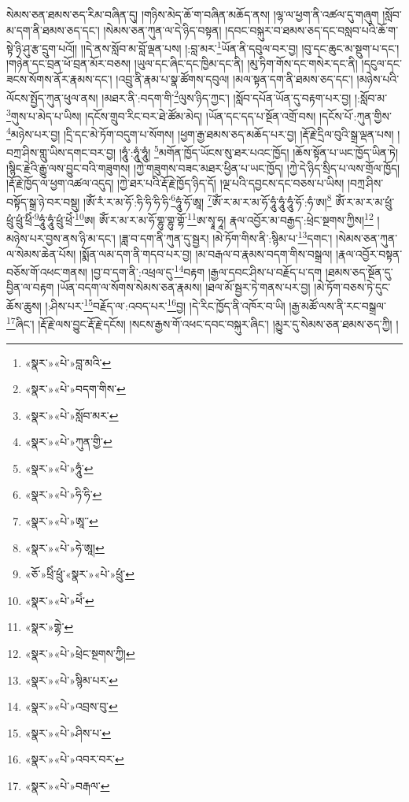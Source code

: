 སེམས་ཅན་ཐམས་ཅད་རིམ་བཞིན་དུ། །གཉིས་མེད་ཆོ་ག་བཞིན་མཆོད་ནས། །ལྷ་ལ་ཕྱག་ནི་འཚལ་དུ་གཞུག །སློབ་མ་དག་ནི་ཐམས་ཅད་དང་། །སེམས་ཅན་ཀུན་ལ་དེ་ཉིད་བསྟན། །དབང་བསྐུར་བ་ཐམས་ཅད་དང་བསླབ་པའི་ཆོ་ག་སྟེ་ཉི་ཤུ་རྩ་དྲུག་པའོ།། །།དེ་ནས་སློབ་མ་བློ་ལྡན་པས། །:བླ་མར་\footnote{«སྣར་»«པེ་»བླ་མའི་}ཡོན་ནི་དབུལ་བར་བྱ། །བུ་དང་ཆུང་མ་སྡུག་པ་དང་། །གཉེན་དང་བྲན་ཕོ་བྲན་མོར་བཅས། །ཡུལ་དང་ཞིང་དང་ཁྱིམ་དང་ནི། །མུ་ཏིག་གོས་དང་གསེར་དང་ནི། །དངུལ་དང་ཟངས་སོགས་ནོར་རྣམས་དང་། །འབྲུ་ནི་རྣམ་པ་སྣ་ཚོགས་དབུལ། །མལ་སྟན་དག་ནི་ཐམས་ཅད་དང་། །མཉེས་པའི་ལོངས་སྤྱོད་ཀུན་ཕུལ་ནས། །མཐར་ནི་:བདག་གི་\footnote{«སྣར་»«པེ་»བདག་གིས་}ལུས་ཉིད་ཀྱང་། །སློབ་དཔོན་ཡོན་དུ་བརྟག་པར་བྱ། །:སློབ་མ་\footnote{«སྣར་»«པེ་»སློབ་མར་}གུས་པ་མེད་པ་ཡིས། །དངོས་གྲུབ་རིང་བར་ཐེ་ཚོམ་མེད། །ཡོན་དང་དད་པ་སྔོན་འགྲོ་བས། །དངོས་པོ་:ཀུན་གྱིས་\footnote{«སྣར་»«པེ་»ཀུན་གྱི་}མཉེས་པར་བྱ། །དྲི་དང་མེ་ཏོག་བདུག་པ་སོགས། །ཕྱག་རྒྱ་ཐམས་ཅད་མཆོད་པར་བྱ། །རྡོ་རྗེ་དྲིལ་བུའི་སྒྲ་ལྡན་པས། །བཀྲ་ཤིས་གླུ་ཡིས་དགང་བར་བྱ། །ཧཱུཾ་:ཧཱུཾ་ཧཱུཾ། \footnote{«སྣར་»«པེ་»ཧཱུཾ་}མགོན་ཁྱོད་ཡོངས་སུ་ཐར་པའང་ཁྱོད། །ཆོས་སྟོན་པ་ཡང་ཁྱོད་ཡིན་ཏེ། །སྙིང་རྗེའི་རྒྱུ་ལས་བྱུང་བའི་གཟུགས། །ཀྱེ་གཟུགས་བཟང་མཐར་ཕྱིན་པ་ཡང་ཁྱོད། །ཀྱེ་དེ་ཉིད་སྲིད་པ་ལས་གྲོལ་ཁྱོད། །རྡོ་རྗེ་ཁྱོད་ལ་ཕྱག་འཚལ་འདུད། །ཀྱེ་ཐར་པའི་རྡོ་རྗེ་ཁྱོད་ཉིད་དོ། །ལྔ་པའི་དབྱངས་དང་བཅས་པ་ཡིས། །བཀྲ་ཤིས་བསྟོད་སྒྲ་ཉེ་བར་བསྡུ། །ཨོཾ་རཾ་ར་མ་ཧོ་:ཧི་ཧི་ཧི་ཧི་\footnote{«སྣར་»«པེ་»ཧི་ཧི་}ཧཱུཾ་ཧོ་ཨཱ། \footnote{«སྣར་»«པེ་»ཨཱ་་}ཨོཾ་ར་མ་ར་མ་ཧོ་ཧཱུཾ་ཧཱུཾ་ཧཱུཾ་ཧོ་:ཧཾ་ཨ།\footnote{«སྣར་»«པེ་»ཧེ་ཨཱ།} ཨོཾ་ར་མ་ར་མ་ཕྲུཾ་ཕྲུཾ་ཕྲུཾ་ཕྲིཾ་\footnote{«ཅོ་»ཕྲིཾ་ཕྲུཾ་«སྣར་»«པེ་»ཕྲུཾ་}ཧཱུཾ་ཧཱུཾ་ཕྲུཾ་ཕྲེཾ་\footnote{«སྣར་»«པེ་»ཕེཾ་}ཨ། ཨོཾ་ར་མ་ར་མ་ཧོ་གྷུ་གྷུ་གྷོ་\footnote{«སྣར་»གྷེ་}ཨ་སྭཱ་ཧཱ། རྣལ་འབྱོར་མ་བརྒྱད་:ཕྲེང་སྔགས་ཀྱིས།\footnote{«སྣར་»«པེ་»ཕྲེང་སྔགས་ཀྱི།} །མཉེས་པར་བྱས་ནས་ཉི་མ་དང་། །ཟླ་བ་དག་ནི་ཀུན་དུ་སྦྱར། །མེ་ཏོག་གིས་ནི་:སྙིམ་པ་\footnote{«སྣར་»«པེ་»སྙིམ་པར་}དགང་། །སེམས་ཅན་ཀུན་ལ་སེམས་ཆེན་པོས། །སྨོན་ལམ་དག་ནི་གདབ་པར་བྱ། །མ་བརྒལ་བ་རྣམས་བདག་གིས་བསྒྲལ། །རྣལ་འབྱོར་བསྟན་བཅོས་གོ་འཕང་གནས། །བྱ་བ་དག་ནི་:འཕྲལ་དུ་\footnote{«སྣར་»«པེ་»འབྲས་བུ་}བརྟག །རྒྱལ་དབང་ཤིས་པ་བརྗོད་པ་དག །ཐམས་ཅད་སྔོན་དུ་བྱིན་ལ་བརྟག །ཡོན་བདག་ལ་སོགས་སེམས་ཅན་རྣམས། །ཐལ་མོ་སྦྱར་ཏེ་གནས་པར་བྱ། །མེ་ཏོག་བཅས་ཏེ་དུང་ཆོས་ཆུས། །:ཤིས་པར་\footnote{«སྣར་»«པེ་»ཤིས་པ་}བརྗོད་ལ་:འབད་པར་\footnote{«སྣར་»«པེ་»འབར་བར་}བྱ། །དེ་རིང་ཁྱོད་ནི་འཁོར་བ་ཡི། །རྒྱ་མཚོ་ལས་ནི་རང་བསྒྲལ་\footnote{«སྣར་»«པེ་»བརྒལ་}ཞིང་། །རྡོ་རྗེ་ལས་བྱུང་རྡོ་རྗེ་དངོས། །སངས་རྒྱས་གོ་འཕང་དབང་བསྐུར་ཞིང་། །མྱུར་དུ་སེམས་ཅན་ཐམས་ཅད་ཀྱི། །

